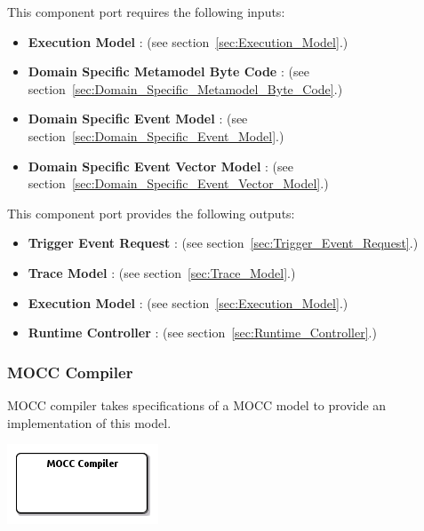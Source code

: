 \documentclass{gemoc} %
\begin{document}
This component port requires the following inputs:
\begin{itemize}
  \item \textbf{Execution Model} :
(see section~\ref{sec:Execution_Model}.)
  \item \textbf{Domain Specific Metamodel Byte Code} :
(see section~\ref{sec:Domain_Specific_Metamodel_Byte_Code}.)
  \item \textbf{Domain Specific Event Model} :
(see section~\ref{sec:Domain_Specific_Event_Model}.)
  \item \textbf{Domain Specific Event Vector Model} :
(see section~\ref{sec:Domain_Specific_Event_Vector_Model}.)
\end{itemize}

This component port provides the following outputs:
\begin{itemize}
  \item \textbf{Trigger Event Request} :
(see section~\ref{sec:Trigger_Event_Request}.)
  \item \textbf{Trace Model} :
(see section~\ref{sec:Trace_Model}.)
  \item \textbf{Execution Model} :
(see section~\ref{sec:Execution_Model}.)
  \item \textbf{Runtime Controller} :
(see section~\ref{sec:Runtime_Controller}.)
\end{itemize}


\subsubsection{MOCC Compiler}
\label{sec:MOCC_Compiler}
MOCC compiler takes specifications of a MOCC model to provide an implementation of this model.
\begin{center}
\includegraphics*[trim=0.0cm 0.0cm 0cm 0.0cm, clip=true]{../images/generated/Generated_MOCC_Compiler.png}
\end{center}
\end{document}
